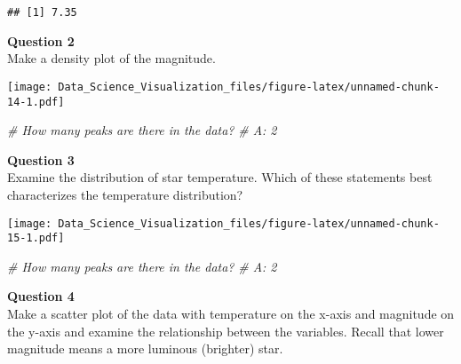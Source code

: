 \documentclass[]{article}
\newenvironment{Shaded}{\begin{snugshade}}{\end{snugshade}}
\newcommand{\CommentTok}[1]{\textcolor[rgb]{0.56,0.35,0.01}{\textit{#1}}}
\newcommand{\KeywordTok}[1]{\textcolor[rgb]{0.13,0.29,0.53}{\textbf{#1}}}
\newcommand{\NormalTok}[1]{#1}
\newcommand{\OperatorTok}[1]{\textcolor[rgb]{0.81,0.36,0.00}{\textbf{#1}}}
\newcommand{\StringTok}[1]{\textcolor[rgb]{0.31,0.60,0.02}{#1}}
\begin{document}
\begin{verbatim}
## [1] 7.35
\end{verbatim}

\textbf{Question 2}\\
Make a density plot of the magnitude.

\begin{Shaded}
\end{Shaded}

\texttt{[image: Data\_Science\_Visualization\_files/figure-latex/unnamed-chunk-14-1.pdf]}

\begin{Shaded}
\begin{Highlighting}[]
\CommentTok{# How many peaks are there in the data?}
\CommentTok{# A: 2}
\end{Highlighting}
\end{Shaded}

\textbf{Question 3}\\
Examine the distribution of star temperature. Which of these statements
best characterizes the temperature distribution?

\begin{Shaded}
\end{Shaded}

\texttt{[image: Data\_Science\_Visualization\_files/figure-latex/unnamed-chunk-15-1.pdf]}

\begin{Shaded}
\begin{Highlighting}[]
\CommentTok{# How many peaks are there in the data?}
\CommentTok{# A: 2}
\end{Highlighting}
\end{Shaded}

\textbf{Question 4}\\
Make a scatter plot of the data with temperature on the x-axis and
magnitude on the y-axis and examine the relationship between the
variables. Recall that lower magnitude means a more luminous (brighter)
star.
\end{document}
